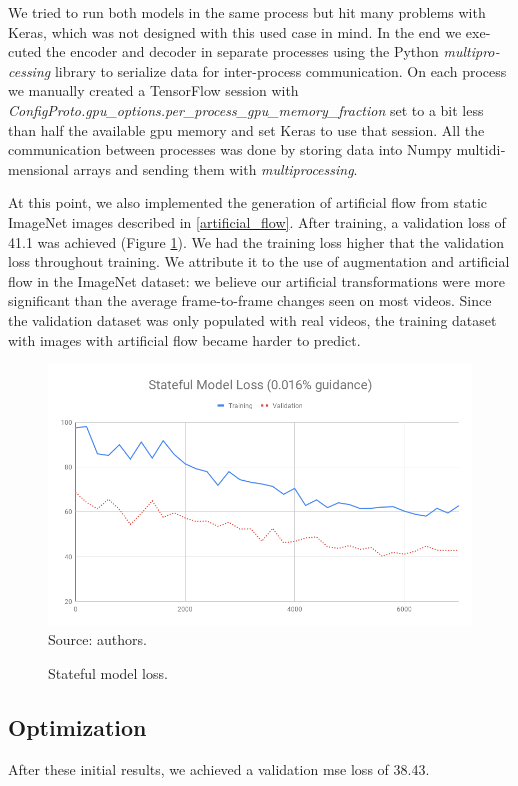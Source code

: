 \documentclass[12pt,openright,oneside,a4paper,english, brazilian]{abntex2}
\begin{document}
\begin{otherlanguage}{english}
We tried to run both models in the same process but hit many problems with Keras, which was not designed with this used case in mind. In the end we executed the encoder and decoder in separate processes using the Python \textit{multiprocessing} library to serialize data for inter-process communication. On each process we manually created a TensorFlow session with \textit{ConfigProto.gpu\_options.per\_process\_gpu\_memory\_fraction} set to a bit less than half the available \acrshort{gpu} memory and set Keras to use that session. All the communication between processes was done by storing data into Numpy multidimensional arrays and sending them with \textit{multiprocessing}.

At this point, we also implemented the generation of artificial flow from static ImageNet images described in \ref{artificial_flow}. After training, a validation loss of 41.1 was achieved (Figure \ref{loss_stateful}). We had the training loss higher that the validation loss throughout training. We attribute it to the use of augmentation and artificial flow in the ImageNet dataset: we believe our artificial transformations were more significant than the average frame-to-frame changes seen on most videos. Since the validation dataset was only populated with real videos, the training dataset with images with artificial flow became harder to predict.

\begin{figure}[!htb]
\centering
\caption{Stateful model loss.}
\includegraphics[width=\textwidth]{loss/Stateful}
Source: authors.
\label{loss_stateful}
\end{figure}

\subsection{Optimization}
After these initial results, we achieved a validation \acrshort{mse} loss of 38.43.


\end{otherlanguage}
\end{document}
